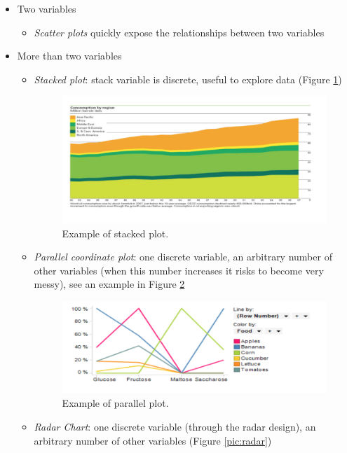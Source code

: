 \begin{itemize}
\item Two variables 
\begin{itemize}
\item \emph{Scatter plots} quickly expose the relationships between two variables
\end{itemize} 
\item  More than two variables
\begin{itemize}
\item \emph{Stacked plot}: stack variable is discrete, useful to explore data (Figure \ref{pic:stacked})
\begin{figure}[h]%
 \centering
 \includegraphics[width=13cm]{./img/06/stacked}
 \caption{\label{pic:stacked} Example of stacked plot.}
\end{figure}
\item \emph{Parallel coordinate plot}: one discrete variable, an arbitrary number of other variables (when this number increases it risks to become very messy), see an example in Figure \ref{pic:parallel}
\begin{figure}[h]%
 \centering
 \includegraphics[width=13cm]{./img/06/parallel}
 \caption{\label{pic:parallel} Example of parallel plot.}
\end{figure}
\item \emph{Radar Chart}: one discrete variable (through the radar design), an arbitrary number of other variables (Figure \ref{pic:radar})

\end{itemize}
\end{itemize}
